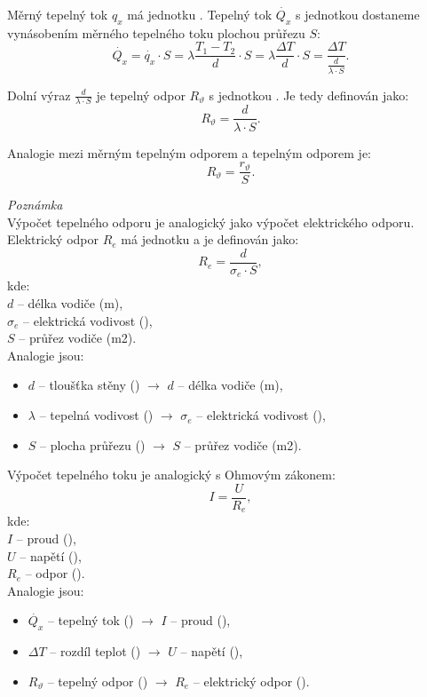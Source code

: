 \documentclass{article}
\begin{document}
Měrný tepelný tok $q_x$ má jednotku \ueqWandMinvsq. Tepelný tok $\dot{Q_x}$ s jednotkou \ueqW dostaneme vynásobením měrného tepelného toku plochou průřezu $S$:
$$
    \dot{Q_x} = \dot{q_x} \cdot S = \lambda \frac{T_1 - T_2}{d} \cdot S = \lambda \frac{\Delta T}{d} \cdot S = \frac{\Delta T}{\frac{d}{\lambda \cdot S}}.
$$

Dolní výraz $\frac{d}{\lambda \cdot S}$ je tepelný odpor $R_{\vartheta}$ s jednotkou \ueqKandWinv. Je tedy definován jako:
$$
    R_{\vartheta} = \frac{d}{\lambda \cdot S}.
$$

Analogie mezi měrným tepelným odporem a tepelným odporem je:
$$
    R_{\vartheta} = \frac{r_{\vartheta}}{S}.
$$

\textit{Poznámka}\\

Výpočet tepelného odporu je analogický jako výpočet elektrického odporu. Elektrický odpor $R_e$ má jednotku \ueqOHM a je definován jako:
$$
    R_e = \frac{d}{\sigma_e \cdot S},
$$
kde:\\
$d$ -- délka vodiče (m),\\
$\sigma_e$ -- elektrická vodivost (\ueqMandOHMinv),\\
$S$ -- průřez vodiče (m2).\\

Analogie jsou:
\begin{itemize}
    \item $d$ -- tloušťka stěny (\ueqM) $\rightarrow$ $d$ -- délka vodiče (m),
    \item $\lambda$ -- tepelná vodivost (\ueqWandMinvsqKinv) $\rightarrow$ $\sigma_e$ -- elektrická vodivost (\ueqMandOHMinv),
    \item $S$ -- plocha průřezu (\ueqMsq) $\rightarrow$ $S$ -- průřez vodiče (m2).
\end{itemize}

Výpočet tepelného toku je analogický s Ohmovým zákonem:
$$
    I = \frac{U}{R_e},
$$
kde:\\
$I$ -- proud (\ueqA),\\
$U$ -- napětí (\ueqV),\\
$R_e$ -- odpor (\ueqOHM).\\

Analogie jsou:
\begin{itemize}
    \item $\dot{Q_x}$ -- tepelný tok (\ueqW) $\rightarrow$ $I$ -- proud (\ueqA),
    \item $\Delta T$ -- rozdíl teplot (\ueqK) $\rightarrow$ $U$ -- napětí (\ueqV),
    \item $R_{\vartheta}$ -- tepelný odpor (\ueqKandWinv) $\rightarrow$ $R_e$ -- elektrický odpor (\ueqOHM).
\end{itemize}
\end{document}
